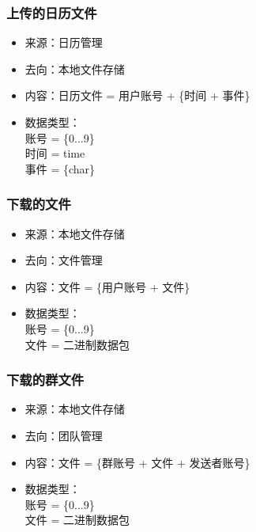             \subsubsection{上传的日历文件}
            \begin{itemize}
            \item 来源：日历管理
            \item 去向：本地文件存储
            \item 内容：日历文件 = 用户账号 + \{时间 + 事件\}
            \item 数据类型：\\
            账号 = \{0...9\}\\
            时间 = time\\
            事件 = \{char\}\\
            \end{itemize}

            \subsubsection{下载的文件}
            \begin{itemize}
            \item 来源：本地文件存储
            \item 去向：文件管理
            \item 内容：文件 = \{用户账号 + 文件\}
            \item 数据类型：\\
            账号 = \{0...9\}\\
            文件 = 二进制数据包\\
            \end{itemize}

            \subsubsection{下载的群文件}
            \begin{itemize}
            \item 来源：本地文件存储
            \item 去向：团队管理
            \item 内容：文件 = \{群账号 + 文件 + 发送者账号\}
            \item 数据类型：\\
            账号 = \{0...9\}\\
            文件 = 二进制数据包\\
            \end{itemize}

